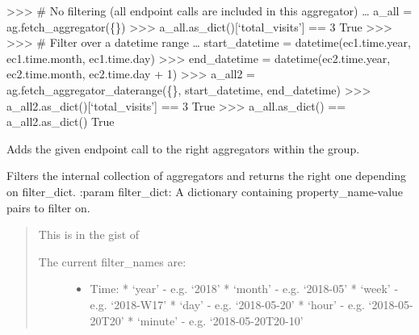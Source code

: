 \documentclass[letterpaper,10pt,english]{sphinxmanual}
\begin{document}
\begin{fulllineitems}
\textgreater{}\textgreater{}\textgreater{} \# No filtering (all endpoint calls are included in this aggregator)
… a\_all = ag.fetch\_aggregator(\{\})
\textgreater{}\textgreater{}\textgreater{} a\_all.as\_dict(){[}‘total\_visits’{]} == 3
True
\textgreater{}\textgreater{}\textgreater{}
\textgreater{}\textgreater{}\textgreater{} \# Filter over a datetime range
… start\_datetime = datetime(ec1.time.year, ec1.time.month, ec1.time.day)
\textgreater{}\textgreater{}\textgreater{} end\_datetime = datetime(ec2.time.year, ec2.time.month, ec2.time.day + 1)
\textgreater{}\textgreater{}\textgreater{} a\_all2 = ag.fetch\_aggregator\_daterange(\{\}, start\_datetime, end\_datetime)
\textgreater{}\textgreater{}\textgreater{} a\_all2.as\_dict(){[}‘total\_visits’{]} == 3
True
\textgreater{}\textgreater{}\textgreater{} a\_all.as\_dict() == a\_all2.as\_dict()
True

\begin{fulllineitems}
\label{\detokenize{pydash_app.dashboard.aggregator.aggregator_group:pydash_app.dashboard.aggregator.aggregator_group.AggregatorGroup.add_endpoint_call}}
Adds the given endpoint call to the right aggregators within the group.

\end{fulllineitems}


\begin{fulllineitems}
\label{\detokenize{pydash_app.dashboard.aggregator.aggregator_group:pydash_app.dashboard.aggregator.aggregator_group.AggregatorGroup.fetch_aggregator}}
Filters the internal collection of aggregators and returns the right one depending on filter\_dict.
:param filter\_dict: A dictionary containing property\_name-value pairs to filter on.
\begin{quote}

This is in the gist of 
\begin{description}
\item[{The current filter\_names are:}] \leavevmode\begin{itemize}
\item {} 
Time:
* ‘year’   - e.g. ‘2018’
* ‘month’  - e.g. ‘2018-05’
* ‘week’   - e.g. ‘2018-W17’
* ‘day’    - e.g. ‘2018-05-20’
* ‘hour’   - e.g. ‘2018-05-20T20’
* ‘minute’ - e.g. ‘2018-05-20T20-10’


\end{itemize}
\end{description}
\end{quote}
\end{fulllineitems}
\end{fulllineitems}
\end{document}
